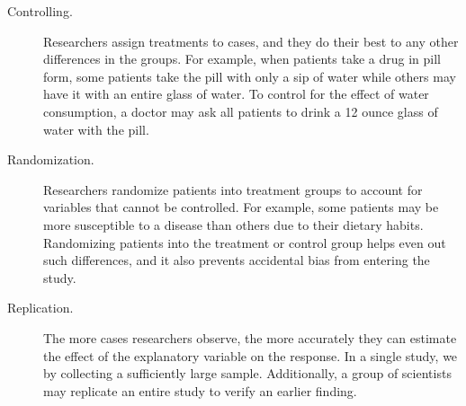 \begin{description}
\item[Controlling.] Researchers assign treatments to cases, and they do their best to  any other differences in the groups. For example, when patients take a drug in pill form, some patients take the pill with only a sip of water while others may have it with an entire glass of water. To control for the effect of water consumption, a doctor may ask all patients to drink a 12 ounce glass of water with the pill.
\item[Randomization.] Researchers randomize patients into treatment groups to account for variables that cannot be controlled. For example, some patients may be more susceptible to a disease than others due to their dietary habits. Randomizing patients into the treatment or control group helps even out such differences, and it also prevents accidental bias from entering the study.
\item[Replication.] The more cases researchers observe, the more accurately they can estimate the effect of the explanatory variable on the response. In a single study, we  by collecting a sufficiently large sample. Additionally, a group of scientists may replicate an entire study to verify an earlier finding.


\end{description}
